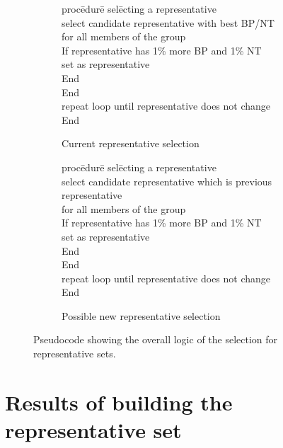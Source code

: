 \begin{figure}
  \begin{subfigure}[b]{0.5\textwidth}
    \begin{tabbing}
      proc\=edur\=e sel\=ecting a representative \\
      \>select candidate representative with best BP/NT \\
      \>for all members of the group \\
        \>\>If representative has 1\% more BP and 1\% NT \\
          \>\>\>set as representative \\
          \>\>End \\
        \>End \\
      \>repeat loop until representative does not change \\
      End
    \end{tabbing}
    \caption{Current representative selection}
    \label{fig:pseudocode-cur-representatives}
  \end{subfigure}
  \begin{subfigure}[b]{0.5\textwidth}
    \begin{tabbing}
      proc\=edur\=e sel\=ecting a representative \\
      \>select candidate representative which is previous representative \\
      \>for all members of the group \\
        \>\>If representative has 1\% more BP and 1\% NT \\
          \>\>\>set as representative \\
          \>\>End \\
        \>End \\
      \>repeat loop until representative does not change \\
      End
    \end{tabbing}
    \caption{Possible new representative selection}
    \label{fig:pseudocode-new-representatives}
  \end{subfigure}
  \caption{Pseudocode showing the overall logic of the selection for
  representative sets.}
  \label{fig:pseudocode-representatives}
\end{figure}

\section{Results of building the representative set}

